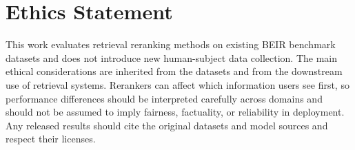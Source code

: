 \section*{Ethics Statement}

This work evaluates retrieval reranking methods on existing BEIR benchmark datasets and does not introduce new human-subject data collection.
The main ethical considerations are inherited from the datasets and from the downstream use of retrieval systems.
Rerankers can affect which information users see first, so performance differences should be interpreted carefully across domains and should not be assumed to imply fairness, factuality, or reliability in deployment.
Any released results should cite the original datasets and model sources and respect their licenses.
